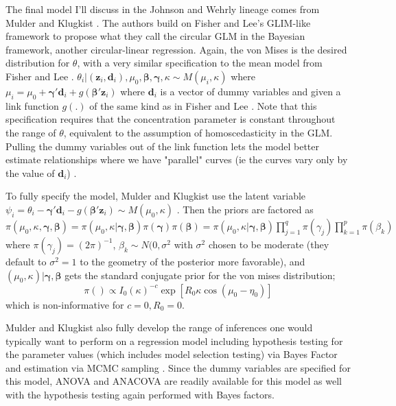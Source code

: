 The final model I'll discuss in the Johnson and Wehrly lineage comes from Mulder and Klugkist \cite{mulder_bayesian_2017}. The authors build on Fisher and Lee's GLIM-like framework to propose what they call the circular GLM in the Bayesian framework, another circular-linear regression. Again, the von Mises is the desired distribution for $\theta$, with a very similar specification to the mean model from Fisher and Lee \cite{fisher_regression_1992}. $\theta_i | (\mathbf{z}_i, \mathbf{d}_i), \mu_0, \bm{\beta}, \bm{\gamma}, \kappa \sim M(\mu_i, \kappa)$ where $\mu_i = \mu_0 + \bm{\gamma}'\mathbf{d}_i + g(\bm{\beta}'\mathbf{z}_i)$ where $\mathbf{d}_i$ is a vector of dummy variables and given a link function $g(.)$ of the same kind as in Fisher and Lee \cite{mulder_bayesian_2017}\cite{fisher_regression_1992}. Note that this specification requires that the concentration parameter is constant throughout the range of $\theta$, equivalent to the assumption of homoscedasticity in the GLM. Pulling the dummy variables out of the link function lets the model better estimate relationships where we have "parallel" curves (ie the curves vary only by the value of $\mathbf{d}_i$) \cite{mulder_bayesian_2017}. 

To fully specify the model, Mulder and Klugkist use the latent variable $\psi_i = \theta_i - \bm{\gamma}'\mathbf{d}_i - g(\bm{\beta}'\mathbf{z}_i) \sim M(\mu_0, \kappa)$ \cite{mulder_bayesian_2017}. Then the priors are factored as $\pi(\mu_0, \kappa, \bm{\gamma}, \bm{\beta}) = \pi(\mu_0, \kappa| \bm{\gamma}, \bm{\beta})\pi(\bm{\gamma})\pi(\bm{\beta}) = \pi(\mu_0, \kappa| \bm{\gamma}, \bm{\beta}) \prod_{j=1}^q \pi(\gamma_j) \prod_{k = 1}^p \pi(\beta_k)$ where $\pi(\gamma_j) = (2\pi)^{-1}$, $\beta_k \sim N(0, \sigma^2$ with $\sigma^2$ chosen to be moderate (they default to $\sigma^2  = 1$ to the geometry of the posterior more favorable), and $(\mu_0, \kappa) | \bm{\gamma},\bm{\beta}$ gets the standard conjugate prior for the von mises distribution; \[\pi() \propto I_0(\kappa)^{-c}\exp\left[R_0\kappa \cos(\mu_0 - \eta_0)\right]\] which is non-informative for $c = 0, R_0 = 0$. 

Mulder and Klugkist also fully develop the range of inferences one would typically want to perform on a regression model including hypothesis testing for the parameter values (which includes model selection testing) via Bayes Factor and estimation via MCMC sampling \cite{mulder_bayesian_2017}. Since the dummy variables are specified for this model, ANOVA and ANACOVA are readily available for this model as well with the hypothesis testing again performed with Bayes factors.

